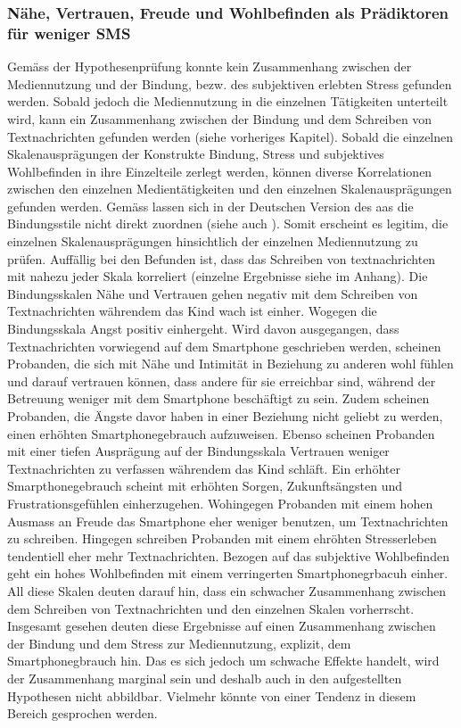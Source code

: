 \subsubsection{Nähe, Vertrauen, Freude und Wohlbefinden als Prädiktoren für weniger SMS}
Gemäss der Hypothesenprüfung konnte kein Zusammenhang zwischen der Mediennutzung und der Bindung, bezw. des subjektiven erlebten Stress gefunden werden. Sobald jedoch die Mediennutzung in die einzelnen Tätigkeiten unterteilt wird, kann ein Zusammenhang zwischen der Bindung und dem Schreiben von Textnachrichten gefunden werden (siehe vorheriges Kapitel). Sobald die einzelnen Skalenausprägungen der Konstrukte Bindung, Stress und subjektives Wohlbefinden in ihre Einzelteile zerlegt werden, können diverse Korrelationen zwischen den einzelnen Medientätigkeiten und den einzelnen Skalenausprägungen gefunden werden. Gemäss  lassen sich in der Deutschen Version des \acrshort{aas} die Bindungsstile nicht direkt zuordnen (siehe auch \textit{}). Somit erscheint es legitim, die einzelnen Skalenausprägungen hinsichtlich der einzelnen Mediennutzung zu prüfen. Auffällig bei den Befunden ist, dass das Schreiben von textnachrichten mit nahezu jeder Skala korreliert (einzelne Ergebnisse siehe  im Anhang). Die Bindungsskalen Nähe und Vertrauen gehen negativ mit dem Schreiben von Textnachrichten währendem das Kind wach ist einher. Wogegen die Bindungsskala Angst positiv einhergeht. Wird davon ausgegangen, dass Textnachrichten vorwiegend auf dem Smartphone geschrieben werden, scheinen Probanden, die sich mit Nähe und Intimität in Beziehung zu anderen wohl fühlen und darauf vertrauen können, dass andere für sie erreichbar sind, während der Betreuung weniger mit dem Smartphone beschäftigt zu sein. Zudem scheinen Probanden, die Ängste davor haben in einer Beziehung nicht geliebt zu werden, einen erhöhten Smartphonegebrauch aufzuweisen. Ebenso scheinen Probanden mit einer tiefen Ausprägung auf der Bindungsskala Vertrauen weniger Textnachrichten zu verfassen währendem das Kind schläft. Ein erhöhter Smarpthonegebrauch scheint mit erhöhten Sorgen, Zukunftsängsten und Frustrationsgefühlen einherzugehen. Wohingegen Probanden mit einem hohen Ausmass an Freude das Smartphone eher weniger benutzen, um Textnachrichten zu schreiben. Hingegen schreiben Probanden mit einem ehröhten Stresserleben tendentiell eher mehr Textnachrichten. Bezogen auf das subjektive Wohlbefinden geht ein hohes Wohlbefinden mit einem verringerten Smartphonegrbacuh einher. All diese Skalen deuten darauf hin, dass ein schwacher Zusammenhang zwischen dem Schreiben von Textnachrichten und den einzelnen Skalen vorherrscht. Insgesamt gesehen deuten diese Ergebnisse auf einen Zusammenhang zwischen der Bindung und dem Stress zur Mediennutzung, explizit, dem Smartphonegbrauch hin. Das es sich jedoch um schwache Effekte handelt, wird der Zusammenhang marginal sein und deshalb auch in den aufgestellten Hypothesen nicht abbildbar. Vielmehr könnte von einer Tendenz in diesem Bereich gesprochen werden. 

